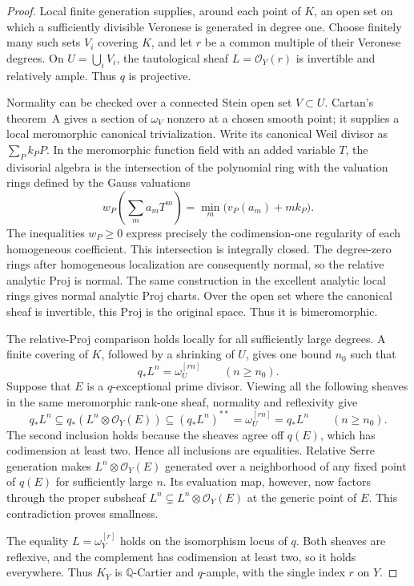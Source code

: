 \documentclass[11pt,a4paper]{article}
\numberwithin{equation}{section}
\theoremstyle{definition}
\theoremstyle{remark}
\newcommand{\Q}{\mathbb Q}\newcommand{\R}{\mathbb R}
\newcommand{\OO}{\mathcal O}\newcommand{\cX}{\mathcal X}
\begin{document}
\begin{proof}
Local finite generation supplies, around each point of $K$, an open
set on which a sufficiently divisible Veronese is generated in degree
one. Choose finitely many such sets $V_i$ covering $K$, and let $r$
be a common multiple of their Veronese degrees. On $U=\bigcup_iV_i$,
the tautological sheaf $L=\OO_Y(r)$ is invertible and relatively ample.
Thus $q$ is projective.

Normality can be checked over a connected Stein open set $V\subset U$.
Cartan's theorem~A gives a section of $\omega_V$ nonzero at a chosen smooth point;
it supplies a local meromorphic canonical trivialization.
Write its canonical Weil divisor as $\sum_P k_PP$.
In the meromorphic function field with an added variable $T$, the
divisorial algebra is the intersection of the polynomial ring with
the valuation rings defined by the Gauss valuations
\[
 w_P\left(\sum_m a_mT^m\right)
   =\min_m\bigl(v_P(a_m)+mk_P\bigr).
\]
The inequalities $w_P\ge0$ express precisely the codimension-one
regularity of each homogeneous coefficient. This intersection is
integrally closed. The degree-zero rings after homogeneous localization
are consequently normal, so the relative analytic Proj is normal.
The same construction in the excellent analytic local rings gives
normal analytic Proj charts. Over the open set where the canonical sheaf is
invertible, this Proj is the original space. Thus it is bimeromorphic.

The relative-Proj comparison holds locally for all sufficiently large
degrees. A finite covering of $K$, followed by a shrinking of $U$,
gives one bound $n_0$ such that
\begin{equation}\label{eq:canonical-proj-push}
 q_*L^n=\omega_U^{[rn]}
 \qquad(n\ge n_0).
\end{equation}
Suppose that $E$ is a $q$-exceptional prime divisor. Viewing all the
following sheaves in the same meromorphic rank-one sheaf, normality
and reflexivity give
\[
 q_*L^n\subseteq q_*(L^n\otimes\OO_Y(E))
 \subseteq(q_*L^n)^{**}
 =\omega_U^{[rn]}=q_*L^n
 \qquad(n\ge n_0).
\]
The second inclusion holds because the sheaves agree off $q(E)$,
which has codimension at least two. Hence all inclusions are equalities.
Relative Serre generation makes $L^n\otimes\OO_Y(E)$ generated over
a neighborhood of any fixed point of $q(E)$ for sufficiently large $n$.
Its evaluation map, however, now factors through
the proper subsheaf $L^n\subsetneq L^n\otimes\OO_Y(E)$ at the
generic point of $E$. This contradiction proves smallness.

The equality $L=\omega_Y^{[r]}$ holds on the isomorphism locus of
$q$. Both sheaves are reflexive, and the complement has codimension
at least two, so it holds everywhere. Thus $K_Y$ is $\Q$-Cartier
and $q$-ample, with the single index $r$ on $Y$.
\end{proof}
\end{document}
